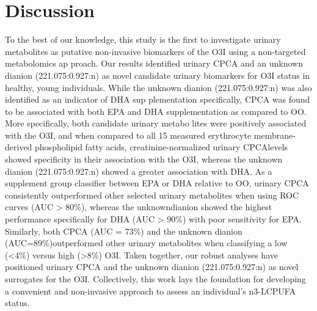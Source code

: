 \documentclass[journal=jacsat,manuscript=article]{achemso}
\begin{document}
\section{Discussion}\label{discussion}

To the best of our knowledge, this study is the first to investigate
urinary metabolites as putative non-invasive biomarkers of the O3I using
a non-targeted metabolomics ap proach. Our results identified urinary
CPCA and an unknown dianion (221.075:0.927:n) as novel candidate urinary
biomarkers for O3I status in healthy, young individuals. While the
unknown dianion (221.075:0.927:n) was also identified as an indicator of
DHA sup plementation specifically, CPCA was found to be associated with
both EPA and DHA supplementation as compared to OO. More specifically,
both candidate urinary metabo lites were positively associated with the
O3I, and when compared to all 15 measured erythrocyte membrane-derived
phospholipid fatty acids, creatinine-normalized urinary CPCAlevels
showed specificity in their association with the O3I, whereas the
unknown dianion (221.075:0.927:n) showed a greater association with DHA.
As a supplement group classifier between EPA or DHA relative to OO,
urinary CPCA consistently outperformed other selected urinary
metabolites when using ROC curves (AUC \textgreater{} 80\%), whereas the
unknowndianion showed the highest performance specifically for DHA (AUC
\textgreater{} 90\%) with poor sensitivity for EPA. Similarly, both CPCA
(AUC = 73\%) and the unknown dianion (AUC=89\%)outperformed other
urinary metabolites when classifying a low (\textless4\%) versus high
(\textgreater8\%) O3I. Taken together, our robust analyses have
positioned urinary CPCA and the unknown dianion (221.075:0.927:n) as
novel surrogates for the O3I. Collectively, this work lays the
foundation for developing a convenient and non-invasive approach to
assess an individual's n3-LCPUFA status.
\end{document}
